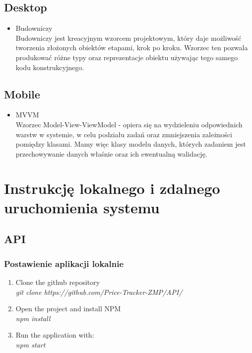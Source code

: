 \documentclass{article}
\begin{document}
    \subsection{Desktop}
    \begin{itemize}
           \item Budowniczy\\
             Budowniczy jest kreacyjnym wzorcem projektowym, który daje możliwość tworzenia złożonych obiektów etapami, krok po kroku. Wzorzec ten pozwala produkować różne typy oraz reprezentacje obiektu używając tego samego kodu konstrukcyjnego.
             \end{itemize}
    \subsection{Mobile}
    \begin{itemize}
           \item MVVM\\
             Wzorzec Model-View-ViewModel - opiera się na wydzieleniu odpowiednich warstw w systemie, w celu podziału zadań oraz zmniejszenia zależności pomiędzy klasami. Mamy więc klasy modelu danych, których zadaniem jest przechowywanie danych właśnie oraz ich ewentualną walidację.
             \end{itemize}

\section{Instrukcję lokalnego i zdalnego uruchomienia systemu}
    \subsection{API}
        \subsubsection{Postawienie aplikacji lokalnie}
        \begin{enumerate}
            \item Clone the github repository\\
                        \emph{git clone https://github.com/Price-Tracker-ZMP/API/} \\
            \item Open the project and install NPM\\
              \emph{npm install} \\
            \item Run the application with:\\
                \emph{npm start} \\
        \end{enumerate}
        
\end{document}
